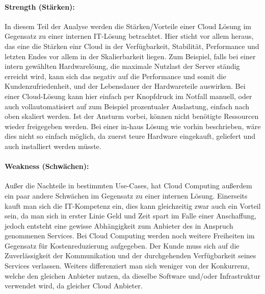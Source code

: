 \paragraph{Strength (Stärken):} In diesem Teil der Analyse werden die Stärken/Vorteile einer Cloud Lösung im Gegensatz zu einer internen IT-Lösung betrachtet. Hier sticht vor allem heraus, das eine die Stärken einr Cloud in der Verfügbarkeit, Stabilität, Performance und letzten Endes vor allem in der Skalierbarkeit liegen. Zum Beispiel, falls bei einer intern gewählten Hardwarelöung, die maximale Nutzlast der Server ständig erreicht wird, kann sich das negativ auf die Performance und somit die Kundenzufriedenheit, und der Lebensdauer der Hardwareteile auswirken. Bei einer Cloud-Lösung kann hier einfach per Knopfdruck im Notfall manuell, oder auch vollautomatisiert auf zum Beispiel prozentualer Auslastung, einfach nach oben skaliert werden. Ist der Ansturm vorbei, können nicht benötigte Ressourcen wieder freigegeben werden.
Bei einer in-haus Lösung wie vorhin beschrieben, wäre dies nicht so einfach möglich, da zuerst teure Hardware eingekauft, geliefert und auch installiert werden müsste. 

\paragraph{Weakness (Schwächen):} Außer die Nachteile in bestimmten Use-Cases, hat Cloud Computing außerdem ein paar andere Schwächen im Gegensatz zu einer internen Lösung. Einerseits kauft man sich die IT-Kompetenz ein, dies kann gleichzeitig zwar auch ein Vorteil sein, da man sich in erster Linie Geld und Zeit spart im Falle einer Anschaffung, jedoch entsteht eine gewisse Abhängigkeit zum Anbieter des in Anspruch genommenen Services. Bei Cloud Computing werden noch weitere Freiheiten im Gegensatz für Kostenreduzierung aufgegeben. Der Kunde muss sich auf die Zuverlässigkeit der Kommunikation und der durchgehenden Verfügbarkeit seines Services verlassen. Weiters differenziert man sich weniger von der Konkurrenz, welche den gleichen Anbieter nutzen, da dieselbe Software und/oder Infrastruktur verwendet wird, da gleicher Cloud Anbieter.

